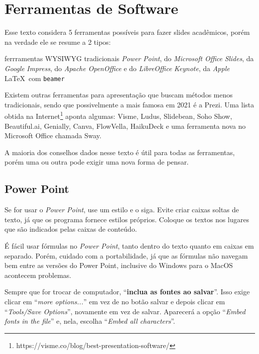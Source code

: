 \section{Ferramentas de Software}
\label{sec:ferramentas}

Esse texto considera 5 ferramentas possíveis para fazer slides acadêmicos, porém na verdade ele se resume a 2 tipos:
\begin{outline}
    \1 ferrramentas WYSIWYG tradicionais
    \2 \textit{Power Point}, do \textit{Microsoft Office}
    \2 \textit{Slides}, da \textit{Google}
    \2 \textit{Impress}, do \textit{Apache OpenOffice} e do \textit{LibreOffice}
    \2 \textit{Keynote}, da \textit{Apple}
    \1 \LaTeX\  com \texttt{beamer}
\end{outline}

Existem outras ferramentas para apresentação que buscam métodos menos tradicionais, sendo que possivelmente a mais famosa em 2021 é a Prezi. Uma lista obtida na Internet\footnote{https://visme.co/blog/best-presentation-software/} aponta algumas: Visme, Ludus, Slidebean, Soho Show, Beautiful.ai, Genially, Canva, FlowVella, HaikuDeck e uma ferramenta nova no Microsoft Office chamada Sway.

A maioria dos conselhos dados nesse texto é útil para todas as ferramentas, porém uma ou outra pode exigir uma nova forma de pensar.

\subsection{Power Point}

Se for usar o \textit{Power Point}, use um estilo e o siga. Evite criar caixas soltas de texto, já que os programa fornece estilos próprios. Coloque os textos nos lugares que são indicados pelas caixas de conteúdo.

É fácil usar fórmulas no \textit{Power Point}, tanto dentro do texto quanto em caixas em separado. Porém, cuidado com a portabilidade, já que as fórmulas não navegam bem entre as versões do Power Point, inclusive do Windows para o MacOS acontecem problemas.

Sempre que for trocar de computador, ``\textbf{inclua as fontes ao salvar}''. Isso exige clicar em ``\textit{more options...}'' em vez de no botão salvar e depois clicar em ``\textit{Tools/Save Options}'', novamente em vez de salvar. Aparecerá a opção ``\textit{Embed fonts in the file}'' e, nela, escolha ``\textit{Embed all characters}''.

